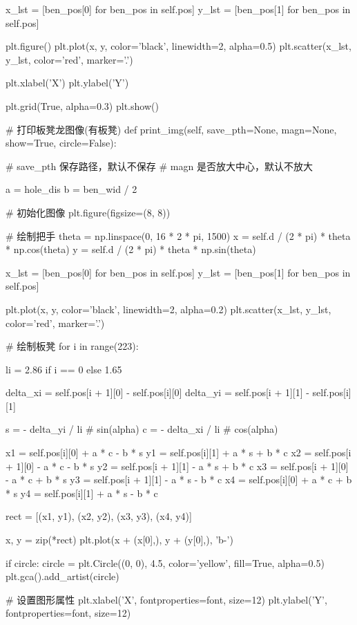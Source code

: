 \documentclass[withoutpreface,bwprint]{cumcmthesis}
\begin{document}
\begin{CodeText}
   x_lst = [ben_pos[0] for ben_pos in self.pos]
   y_lst = [ben_pos[1] for ben_pos in self.pos]

   plt.figure()
   plt.plot(x, y, color='black', linewidth=2, alpha=0.5)
   plt.scatter(x_lst, y_lst, color='red', marker='.')

   plt.xlabel('X')
   plt.ylabel('Y')

   plt.grid(True, alpha=0.3)
   plt.show()

# 打印板凳龙图像(有板凳)
def print_img(self, save_pth=None, magn=None, show=True, circle=False):

   # save_pth 保存路径，默认不保存
   # magn 是否放大中心，默认不放大

   a = hole_dis
   b = ben_wid / 2

   # 初始化图像
   plt.figure(figsize=(8, 8))


# 绘制把手
theta = np.linspace(0, 16 * 2 * pi, 1500)
x = self.d / (2 * pi) * theta * np.cos(theta)
y = self.d / (2 * pi) * theta * np.sin(theta)

x_lst = [ben_pos[0] for ben_pos in self.pos]
y_lst = [ben_pos[1] for ben_pos in self.pos]

plt.plot(x, y, color='black', linewidth=2, alpha=0.2)
plt.scatter(x_lst, y_lst, color='red', marker='.')

# 绘制板凳
for i in range(223):

   li = 2.86 if i == 0 else 1.65

   delta_xi = self.pos[i + 1][0] - self.pos[i][0]
   delta_yi = self.pos[i + 1][1] - self.pos[i][1]

   s = - delta_yi / li # sin(alpha)
   c = - delta_xi / li # cos(alpha)

   x1 = self.pos[i][0] + a * c - b * s
   y1 = self.pos[i][1] + a * s + b * c
   x2 = self.pos[i + 1][0] - a * c - b * s
   y2 = self.pos[i + 1][1] - a * s + b * c
   x3 = self.pos[i + 1][0] - a * c + b * s
   y3 = self.pos[i + 1][1] - a * s - b * c
   x4 = self.pos[i][0] + a * c + b * s
   y4 = self.pos[i][1] + a * s - b * c

   rect = [(x1, y1), (x2, y2), (x3, y3), (x4, y4)]

   x, y = zip(*rect)
   plt.plot(x + (x[0],), y + (y[0],), 'b-')

if circle:
   circle = plt.Circle((0, 0), 4.5, color='yellow', fill=True, alpha=0.5)
   plt.gca().add_artist(circle)

# 设置图形属性
plt.xlabel('X', fontproperties=font, size=12)
plt.ylabel('Y', fontproperties=font, size=12)


\end{CodeText}
\end{document}
